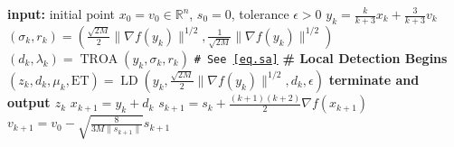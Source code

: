 \documentclass{mcom-l}
\numberwithin{equation}{section}
\begin{document}
\begin{algorithm}[ht]
    \caption{Global-Local Accelerated Trust-Region Method (\atr{})}\label{alg.accelerated utr}
    \begin{algorithmic}[1]
        \STATE \textbf{input:} initial point $x_0=v_0\in \mathbb{R}^n$, $s_0=0$, tolerance $\epsilon>0$
        \STATE $y_k = \frac{k}{k+3}x_k+\frac{3}{k+3}v_k$
        \STATE $(\sigma_k,r_k) = (\tfrac{\sqrt{2M}}{2}\|\nabla f(y_k)\|^{1/2},\tfrac{1}{\sqrt{2M}}\|\nabla f(y_k)\|^{1/2})$
        \STATE $(d_k,\lambda_k) = \operatorname{TROA}(y_k,\sigma_k,r_k)$ \hfill\texttt{\# See \eqref{eq.sa}}
         \label{line.if}
        \STATE \textbf{\# Local Detection Begins}
        \STATE $(z_k,d_k,\mu_k,\text{ET}) = \operatorname{LD}(y_k,\tfrac{\sqrt{2M}}{2}\|\nabla f(y_k)\|^{1/2},d_k,\epsilon)$
        \label{line.early terminate main}
        \STATE \textbf{terminate and output $z_k$}
        \ENDIF
        \ENDIF
        \STATE $x_{k+1}=y_k+d_k$
        \STATE $s_{k+1} = s_{k}+\tfrac{(k+1)(k+2)}{2}\nabla f(x_{k+1})$
        \STATE $v_{k+1} = v_0-\sqrt{\tfrac{8}{3M\|s_{k+1}\|}}s_{k+1}$
        \ENDFOR
    \end{algorithmic}
\end{algorithm}
\end{document}

